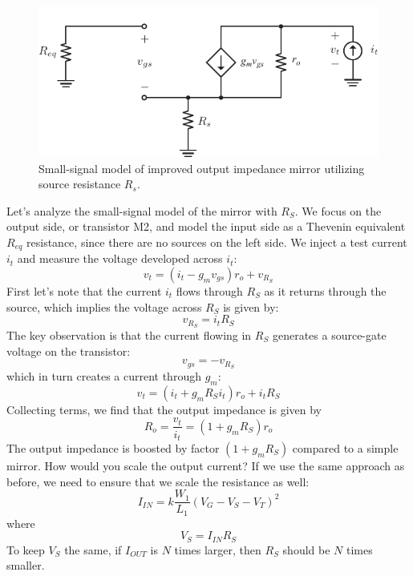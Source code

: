 \begin{figure}[tb]
\begin{center}
\includegraphics[scale=1]{10mirrror_Rs_ss.pdf}
\end{center}
\caption{Small-signal model of improved output impedance mirror utilizing source resistance $R_s$.} \label{fig:10mirrror_Rs_ss.pdf}
\end{figure}

Let's analyze the small-signal model of the mirror with $R_S$.  We focus on the output side, or transistor M2, and model the input side as a Thevenin equivalent $R_{eq}$ resistance, since there are no sources on the left side.  We inject a test current $i_t$ and measure the voltage developed across $i_t$:
%
\begin{equation}
	{v_t} = ({i_t} - {g_m}{v_{gs}}){r_o} + {v_{{R_S}}}
\end{equation}
%
First let's note that the current $i_t$ flows through $R_S$ as it returns through the source, which implies the voltage across $R_S$ is given by:
%
\begin{equation}
	{v_{{R_S}}} = {i_t}{R_S}
\end{equation}
%
The key observation is that the current flowing in $R_S$ generates a source-gate voltage on the transistor:
%
\begin{equation}
	{v_{gs}} = - {v_{{R_S}}}
\end{equation}
%
which in turn creates a current through $g_m$:
%
\begin{equation}
	{v_t} = ({i_t} + {g_m}{R_S}{i_t}){r_o} + {i_t}{R_S}
\end{equation}
%
Collecting terms, we find that the output impedance is given by
%
\begin{equation}
	{R_o} = \frac{{{v_t}}}{{{i_t}}} = \left( {1 + {g_m}{R_S}} \right){r_o}
\end{equation}
%
The output impedance is boosted by factor $(1 + {g_m}{R_S})$ compared to a simple mirror. How would you scale the output current?  If we use the same approach as before, we need to ensure that we scale the resistance as well:
%
\begin{equation}
	{I_{IN}} = k\frac{{{W_1}}}{{{L_1}}}{({V_G} - {V_S} - {V_T})^2}
\end{equation}
%
where
%
\begin{equation}
	{V_S} = {I_{IN}}{R_S}
\end{equation}
%
To keep $V_S$ the same, if $I_{OUT}$ is $N$ times larger, then $R_S$ should be $N$ times smaller. 




